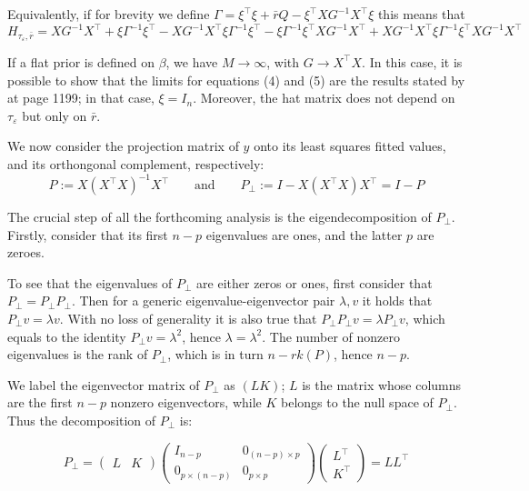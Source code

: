 \documentclass[openany]{book}
\begin{document}
Equivalently, if for brevity we define $\Gamma = \xi ^{\top} \xi + \bar{r} Q - \xi^{\top} X G^{-1} X^{\top} \xi$ this means that 
\begin{equation}
H_{\tau_{\varepsilon}, \bar{r}} = XG^{-1}X^{\top} + \xi \Gamma^{-1} \xi^{\top} -
XG^{-1}X^{\top} \xi \Gamma^{-1} \xi^{\top} -  \xi \Gamma^{-1} \xi^{\top}XG^{-1}X^{\top}+XG^{-1}X^{\top} \xi \Gamma^{-1} \xi^{\top} XG^{-1}X^{\top}
\end{equation}

 If a flat prior is defined on $\beta$, we have $M \longrightarrow \infty$, with $G \longrightarrow X^{\top}X$. In this case, it is possible to show that the limits for equations (4) and (5) are the results stated by \citep{RHZ} at page 1199; in that case, $\xi = I_n$. Moreover, the hat matrix does not depend on $\tau_{\varepsilon}$ but only on $\bar{r}$.


We now consider the projection matrix of $y$ onto its least squares fitted values, and its orthongonal complement, respectively:
$$
P := X(X^{\top}X)^{-1}X^{\top} \quad \quad \text{and} \quad \quad P_{\bot} := I - X(X^{\top}X)X^{\top} = I - P
$$

The crucial step of all the forthcoming analysis is the eigendecomposition of $P_{\bot}$. Firstly, consider that its first $n-p$ eigenvalues are ones, and the latter $p$ are zeroes.

To see that the eigenvalues of $P_{\bot}$ are either zeros or ones, first consider that $P_{\bot} = P_{\bot} P_{\bot}$. Then for a generic eigenvalue-eigenvector pair $\lambda, v$ it holds that $P_{\bot} v = \lambda v$. With no loss of generality it is also true that $P_{\bot} P_{\bot} v = \lambda P_{\bot} v$, which equals to the identity $P_{\bot} v = \lambda^2 $, hence $\lambda = \lambda^2$. The number of nonzero eigenvalues is the rank of $P_{\bot}$, which is in turn $n - rk(P)$, hence $n-p$. 

We label the eigenvector matrix of $P_{\bot}$ as $(L K)$; $L$ is the matrix whose columns are the first $n-p$ nonzero eigenvectors, while $K$ belongs to the null space of $P_{\bot}$. Thus the decomposition of $P_{\bot}$ is:

$$
P_{\bot} =  \begin{pmatrix}L & K \end{pmatrix} 
\begin{pmatrix} I_{n-p} & 0_{(n-p) \times p } \\ 0_{p \times (n-p)} & 0_{p \times p} \end{pmatrix}
 \begin{pmatrix} L^{\top} \\ K^{\top} \end{pmatrix} = L L^{\top}
$$
\end{document}

